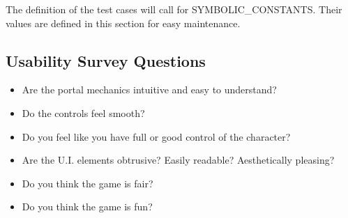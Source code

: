 \documentclass[12pt, titlepage]{article}
\begin{document}
The definition of the test cases will call for SYMBOLIC\_CONSTANTS.
Their values are defined in this section for easy maintenance.

\subsection{Usability Survey Questions}

\begin{itemize}
Since many functionalities of Mari0 are difficult to test, either due to testing having to be done manually or a bias by the development team during testing, the following usability suvey questions have been listed to test some of these difficult functionalities
  \item Are the portal mechanics intuitive and easy to understand?
  \item Do the controls feel smooth?
  \item Do you feel like you have full or good control of the character?
  \item Are the U.I. elements obtrusive? Easily readable? Aesthetically pleasing?
  \item Do you think the game is fair?
  \item Do you think the game is fun?
\end{itemize}
\end{document}

